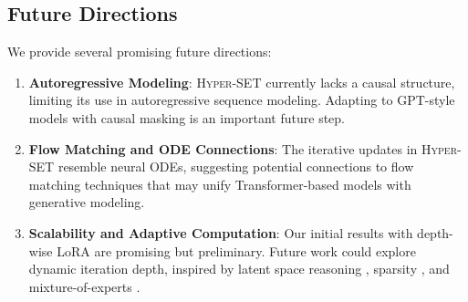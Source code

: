 \subsection{Future Directions}
We provide several promising future directions:
\begin{enumerate}[leftmargin=*]
    \item \textbf{Autoregressive Modeling}: \textsc{Hyper-SET} currently lacks a causal structure, limiting its use in autoregressive sequence modeling. Adapting to GPT-style models with causal masking is an important future step.
    \item \textbf{Flow Matching and ODE Connections}: The iterative updates in \textsc{Hyper-SET} resemble neural ODEs, suggesting potential connections to flow matching techniques that may unify Transformer-based models with generative modeling.
    \item \textbf{Scalability and Adaptive Computation}: Our initial results with depth-wise LoRA are promising but preliminary. Future work could explore dynamic iteration depth, inspired by latent space reasoning \citep{geiping2025scaling}, sparsity \citep{tan-etal-2023-sparse}, and mixture-of-experts \citep{csordas2024moeut}.
\end{enumerate}